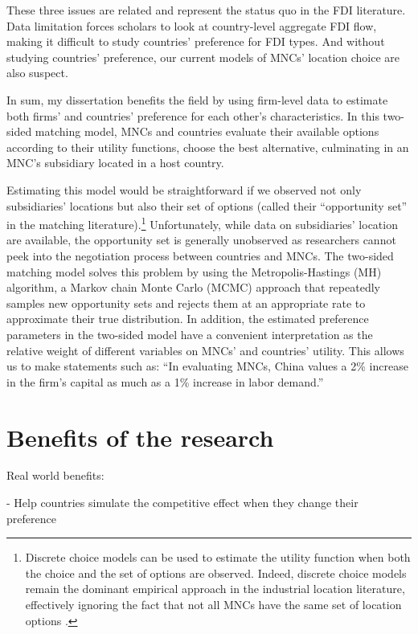 These three issues are related and represent the status quo in the FDI
literature. Data limitation forces scholars to look at country-level aggregate
FDI flow, making it difficult to study countries' preference for FDI types. And
without studying countries' preference, our current models of MNCs' location
choice are also suspect.

In sum, my dissertation benefits the field by using firm-level data to estimate
both firms' and countries' preference for each other's characteristics. In this
two-sided matching model, MNCs and countries evaluate their available options
according to their utility functions, choose the best alternative, culminating
in an MNC's subsidiary located in a host country.

Estimating this model would be straightforward if we observed not only
subsidiaries' locations but also their set of options (called their
``opportunity set'' in the matching literature).\footnote{Discrete choice models
  can be used to estimate the utility function when both the choice and the set
  of options are observed. Indeed, discrete choice models remain the dominant
  empirical approach in the industrial location literature, effectively ignoring
  the fact that not all MNCs have the same set of location options
  \citep{Arauzo-Carod2010}.} Unfortunately, while data on subsidiaries' location
are available, the opportunity set is generally unobserved as researchers cannot
peek into the negotiation process between countries and MNCs. The two-sided
matching model solves this problem by using the Metropolis-Hastings (MH)
algorithm, a Markov chain Monte Carlo (MCMC) approach that repeatedly samples
new opportunity sets and rejects them at an appropriate rate to approximate
their true distribution. In addition, the estimated preference parameters in the
two-sided model have a convenient interpretation as the relative weight of
different variables on MNCs' and countries' utility. This allows us to make
statements such as: ``In evaluating MNCs, China values a 2\% increase in the
firm's capital as much as a 1\% increase in labor demand.''

\section{Benefits of the research}

Real world benefits:

- Help countries simulate the competitive effect when they change their
preference

